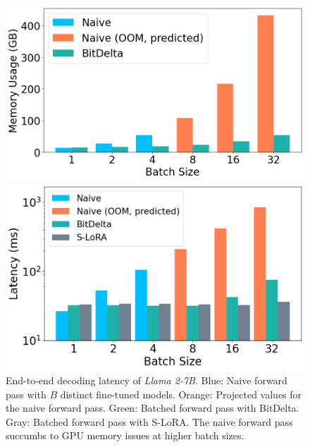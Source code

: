 \documentclass[numbers]{article}
\newcommand{\oursmethod}{BitDelta\xspace}
\begin{document}
\begin{figure}[htbp]
    \centering
    \begin{minipage}{0.48\textwidth}
        \centering
        \includegraphics[width=\textwidth]{memusage.png}
        \caption{Memory usage of \textit{Llama 2-7B}, assuming each sequence in the batch has a length of $128$.  Blue: Memory usage of the naive method, separately storing $B$ distinct fine-tuned models. Orange: Projected values for the naive method. Green: Memory usage of \oursmethod. The naive forward pass succumbs to GPU memory issues at higher batch sizes.}
        \label{fig:memusage}
    \end{minipage}
    \hfill
    \begin{minipage}{0.48\textwidth}
        \centering
        \includegraphics[width=\textwidth]{e2e.png}
        \caption{End-to-end decoding latency of \textit{Llama 2-7B}. Blue: Naive forward pass with $B$ distinct fine-tuned models. Orange: Projected values for the naive forward pass. Green: Batched forward pass with \oursmethod. Gray: Batched forward pass with S-LoRA. The naive forward pass succumbs to GPU memory issues at higher batch sizes.}
        \label{fig:e2e}
    \end{minipage}
\end{figure}
\end{document}
